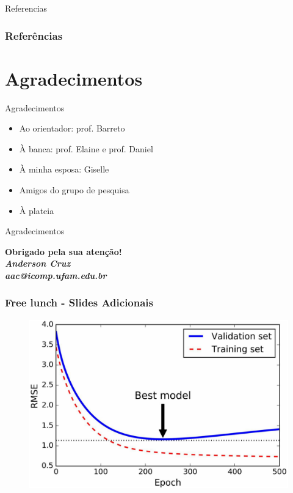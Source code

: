 \documentclass{beamer}
\begin{document}
\begin{frame}{Referencias}
\frametitle{Referências}
    \tiny{ }
    
\end{frame}


\section{Agradecimentos}
\begin{frame}{Agradecimentos}
\begin{itemize}
 \item Ao orientador: prof. Barreto
\item À banca: prof. Elaine e prof. Daniel
\item À minha esposa: Giselle
\item Amigos do grupo de pesquisa
\item À plateia
\end{itemize}

\end{frame}

  \begin{frame}{Agradecimentos}
  \begin{center}
 
  \textcolor{VerdeUFAM}{\Large \textbf{Obrigado pela sua atenção!}} \\
  \vspace*{20px}
  \textit{\textbf{Anderson Cruz}} \\
  \textit{\textbf{aac@icomp.ufam.edu.br}}
 
  \end{center}
  \end{frame}

 
\begin{frame}
\frametitle{Free lunch - Slides Adicionais}
\begin{figure}
\centering
\includegraphics[scale=0.25]{figuras/best-model.png}
\label{fig:arquitetura4}
\end{figure}
\end{frame}  
\end{document}
